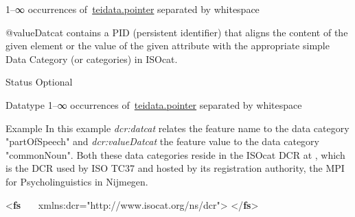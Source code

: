 \begin{reflist}
\begin{sansreflist}
\begin{reflist}
  1–∞ occurrences of \hyperref[TEI.teidata.pointer]{teidata.pointer} separated by whitespace
\end{reflist}  
    \item[@valueDatcat]
  contains a PID (persistent identifier) that aligns the content of the given element or the value of the given attribute with the appropriate simple Data Category (or categories) in ISOcat.
\begin{reflist}
    \item[{Status}]
  Optional
    \item[{Datatype}]
  1–∞ occurrences of \hyperref[TEI.teidata.pointer]{teidata.pointer} separated by whitespace
\end{reflist}  
\end{sansreflist}  
    \item[{Example}]
  In this example {\itshape dcr:datcat} relates the feature name to the data category "partOfSpeech" and {\itshape dcr:valueDatcat} the feature value to the data category "commonNoun". Both these data categories reside in the ISOcat DCR at , which is the DCR used by ISO TC37 and hosted by its registration authority, the MPI for Psycholinguistics in Nijmegen.\leavevmode\bgroup{}\exampleFont \begin{shaded}\noindent\mbox{}{<\textbf{fs}\mbox{}\newline 
   xmlns:dcr="http://www.isocat.org/ns/dcr">}\mbox{}\newline 
{}\mbox{}\newline 
{</\textbf{fs}>}\end{shaded}\egroup 



\end{reflist}
